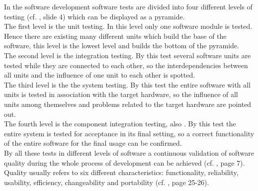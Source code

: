 In the software development software tests are divided into four different levels of testing (cf. \cite{junit}, slide 4) which can be displayed as a pyramide. 
\\
The first level is the unit testing. In this level only one software module is tested.
Hence there are existing many different units which build the base of the software, this level is the lowest level and builds the bottom of the pyramide.
\\
The second level is the integration testing. By this test several software units are tested while they are connected to each other, so the interdependencies between all units and the influence of one unit to each other is spotted.
\\
The third level is the the system testing. By this test the entire software with all units is tested in association with the target hardware, so the influence of all units among themselves and problems related to the target hardware are pointed out.
\\
The fourth level is the component integration testing, also . By this test the entire system is tested for acceptance in its final setting, so a correct functionality of the entire software for the final usage can be confirmed.
\\
By all these tests in different levels of software a continuous validation of software quality during the whole process of development can be achieved (cf. \cite{SBB11}, page 7).
Quality usually refers to six different characteristics: functionality, reliability, usability, efficiency, changeability and portability (cf. \cite{Liu13}, page 25-26).








